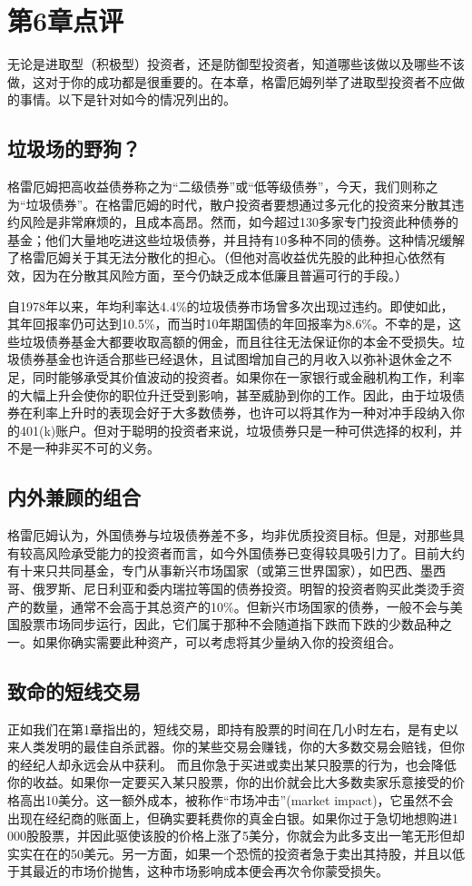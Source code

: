 \documentclass[12pt,oneside]{book}
\begin{document}
\section{第6章点评}
无论是进取型（积极型）投资者，还是防御型投资者，知道哪些该做以及哪些不该做，这对于你的成功都是很重要的。在本章，格雷厄姆列举了进取型投资者不应做的事情。以下是针对如今的情况列出的。

\subsection{垃圾场的野狗？}
格雷厄姆把高收益债券称之为“二级债券”或“低等级债券”，今天，我们则称之为“垃圾债券”。在格雷厄姆的时代，散户投资者要想通过多元化的投资来分散其违约风险是非常麻烦的，且成本高昂。然而，如今超过130多家专门投资此种债券的基金；他们大量地吃进这些垃圾债券，并且持有10多种不同的债券。这种情况缓解了格雷厄姆关于其无法分散化的担心。（但他对高收益优先股的此种担心依然有效，因为在分散其风险方面，至今仍缺乏成本低廉且普遍可行的手段。）

自1978年以来，年均利率达4.4\%的垃圾债券市场曾多次出现过违约。即使如此，其年回报率仍可达到10.5\%，而当时10年期国债的年回报率为8.6\%。不幸的是，这些垃圾债券基金大都要收取高额的佣金，而且往往无法保证你的本金不受损失。垃圾债券基金也许适合那些已经退休，且试图增加自己的月收入以弥补退休金之不足，同时能够承受其价值波动的投资者。如果你在一家银行或金融机构工作，利率的大幅上升会使你的职位升迁受到影响，甚至威胁到你的工作。因此，由于垃圾债券在利率上升时的表现会好于大多数债券，也许可以将其作为一种对冲手段纳入你的401(k)账户。但对于聪明的投资者来说，垃圾债券只是一种可供选择的权利，并不是一种非买不可的义务。


\subsection{内外兼顾的组合}
格雷厄姆认为，外国债券与垃圾债券差不多，均非优质投资目标。但是，对那些具有较高风险承受能力的投资者而言，如今外国债券已变得较具吸引力了。目前大约有十来只共同基金，专门从事新兴市场国家（或第三世界国家），如巴西、墨西哥、俄罗斯、尼日利亚和委内瑞拉等国的债券投资。明智的投资者购买此类烫手资产的数量，通常不会高于其总资产的10\%。但新兴市场国家的债券，一般不会与美国股票市场同步运行，因此，它们属于那种不会随道指下跌而下跌的少数品种之一。如果你确实需要此种资产，可以考虑将其少量纳入你的投资组合。

\subsection{致命的短线交易}
正如我们在第1章指出的，短线交易，即持有股票的时间在几小时左右，是有史以来人类发明的最佳自杀武器。你的某些交易会赚钱，你的大多数交易会赔钱，但你的经纪人却永远会从中获利。
而且你急于买进或卖出某只股票的行为，也会降低你的收益。如果你一定要买入某只股票，你的出价就会比大多数卖家乐意接受的价格高出10美分。这一额外成本，被称作“市场冲击”(market impact)，它虽然不会出现在经纪商的账面上，但确实要耗费你的真金白银。如果你过于急切地想购进1 000股股票，并因此驱使该股的价格上涨了5美分，你就会为此多支出一笔无形但却实实在在的50美元。另一方面，如果一个恐慌的投资者急于卖出其持股，并且以低于其最近的市场价抛售，这种市场影响成本便会再次令你蒙受损失。
\end{document}

